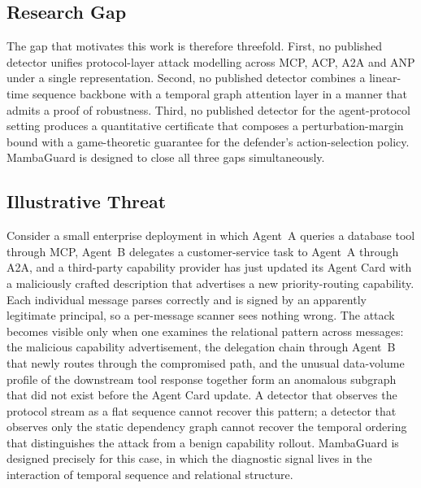 \documentclass{ieeeaccess}
\begin{document}
\subsection{Research Gap}
\label{sec:gap}
The gap that motivates this work is therefore threefold. First, no published detector unifies protocol-layer attack modelling across MCP, ACP, A2A and ANP under a single representation. Second, no published detector combines a linear-time sequence backbone with a temporal graph attention layer in a manner that admits a proof of robustness. Third, no published detector for the agent-protocol setting produces a quantitative certificate that composes a perturbation-margin bound with a game-theoretic guarantee for the defender's action-selection policy. MambaGuard is designed to close all three gaps simultaneously.

\subsection{Illustrative Threat}
Consider a small enterprise deployment in which Agent~A queries a database tool through MCP, Agent~B delegates a customer-service task to Agent~A through A2A, and a third-party capability provider has just updated its Agent Card with a maliciously crafted description that advertises a new priority-routing capability. Each individual message parses correctly and is signed by an apparently legitimate principal, so a per-message scanner sees nothing wrong. The attack becomes visible only when one examines the relational pattern across messages: the malicious capability advertisement, the delegation chain through Agent~B that newly routes through the compromised path, and the unusual data-volume profile of the downstream tool response together form an anomalous subgraph that did not exist before the Agent Card update. A detector that observes the protocol stream as a flat sequence cannot recover this pattern; a detector that observes only the static dependency graph cannot recover the temporal ordering that distinguishes the attack from a benign capability rollout. MambaGuard is designed precisely for this case, in which the diagnostic signal lives in the interaction of temporal sequence and relational structure.
\end{document}
